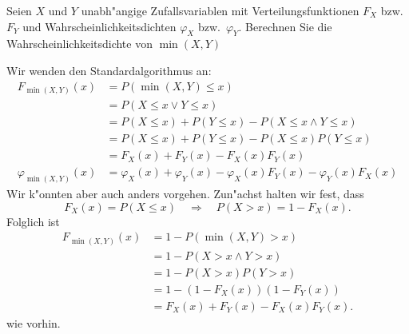 Seien $X$ und $Y$  unabh"angige Zufallsvariablen mit Verteilungsfunktionen
$F_X$ bzw.~$F_Y$ und Wahrscheinlichkeitsdichten $\varphi_X$ bzw.~$\varphi_Y$.
Berechnen Sie die Wahrscheinlichkeitsdichte von $\min(X,Y)$

\begin{loesung}
Wir wenden den Standardalgorithmus an:
\begin{align*}
F_{\min(X,Y)}(x)
&=
P(\min(X,Y)\le x)
\\
&=P(X\le x\vee Y\le x)
\\
&=P(X\le x) + P(Y\le x) - P(X\le x\wedge Y\le x)
\\
&=P(X\le x) + P(Y\le x) - P(X\le x)P(Y\le x)
\\
&=F_X(x)+F_Y(x)-F_X(x)F_Y(x)
\\
\varphi_{\min(X,Y)}(x)
&=
\varphi_X(x)+\varphi_Y(x)-\varphi_X(x)F_Y(x)-\varphi_Y(x)F_X(x)
\end{align*}
Wir k"onnten aber auch anders vorgehen. Zun"achst halten wir fest,
dass
\[
F_X(x)=P(X\le x)
\quad
\Rightarrow
\quad
P(X>x)=1-F_X(x).
\]
Folglich ist
\begin{align*}
F_{\min(X,Y)}(x)
&=
1-P(\min(X,Y) > x)
\\
&=
1-P(X>x\wedge Y>x)
\\
&=1-P(X>x)P(Y>x)
\\
&=1-(1-F_X(x))(1-F_Y(x))
\\
&=
F_X(x)+F_Y(x)-F_X(x)F_Y(x).
\end{align*}
wie vorhin.
\end{loesung}

